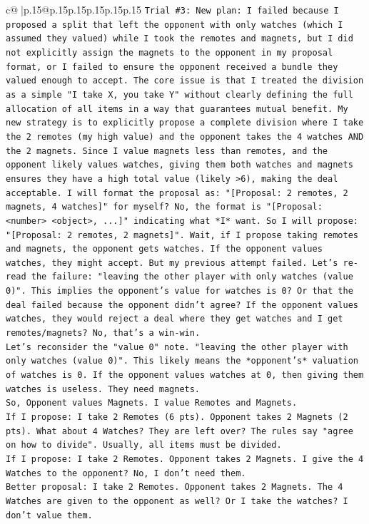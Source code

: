 \documentclass{article}
\begin{document}
{\begin{supertabular}{c@{$\;$}|p{.15\linewidth}@{}p{.15\linewidth}p{.15\linewidth}p{.15\linewidth}p{.15\linewidth}p{.15\linewidth}}
{{{\texttt{Trial \#3: New plan: I failed because I proposed a split that left the opponent with only watches (which I assumed they valued) while I took the remotes and magnets, but I did not explicitly assign the magnets to the opponent in my proposal format, or I failed to ensure the opponent received a bundle they valued enough to accept. The core issue is that I treated the division as a simple "I take X, you take Y" without clearly defining the full allocation of all items in a way that guarantees mutual benefit. My new strategy is to explicitly propose a complete division where I take the 2 remotes (my high value) and the opponent takes the 4 watches AND the 2 magnets. Since I value magnets less than remotes, and the opponent likely values watches, giving them both watches and magnets ensures they have a high total value (likely >6), making the deal acceptable. I will format the proposal as: "{[}Proposal: 2 remotes, 2 magnets, 4 watches{]}" for myself? No, the format is "{[}Proposal: <number> <object>, ...{]}" indicating what *I* want. So I will propose: "{[}Proposal: 2 remotes, 2 magnets{]}". Wait, if I propose taking remotes and magnets, the opponent gets watches. If the opponent values watches, they might accept. But my previous attempt failed. Let's re{-}read the failure: "leaving the other player with only watches (value 0)". This implies the opponent's value for watches is 0? Or that the deal failed because the opponent didn't agree? If the opponent values watches, they would reject a deal where they get watches and I get remotes/magnets? No, that's a win{-}win.} \\
\texttt{Let's reconsider the "value 0" note. "leaving the other player with only watches (value 0)". This likely means the *opponent's* valuation of watches is 0. If the opponent values watches at 0, then giving them watches is useless. They need magnets.} \\
\texttt{So, Opponent values Magnets. I value Remotes and Magnets.} \\
\texttt{If I propose: I take 2 Remotes (6 pts). Opponent takes 2 Magnets (2 pts). What about 4 Watches? They are left over? The rules say "agree on how to divide". Usually, all items must be divided.} \\
\texttt{If I propose: I take 2 Remotes. Opponent takes 2 Magnets. I give the 4 Watches to the opponent? No, I don't need them.} \\
\texttt{Better proposal: I take 2 Remotes. Opponent takes 2 Magnets. The 4 Watches are given to the opponent as well? Or I take the watches? I don't value them.} \\
}}}
\end{supertabular}}
\end{document}
